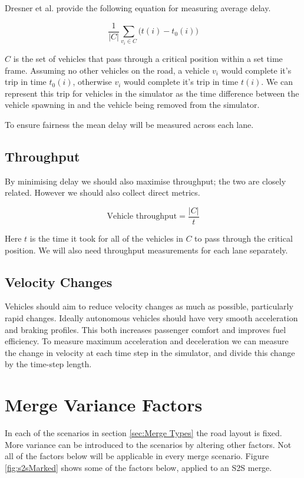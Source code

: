 Dresner et al. provide the following equation for measuring average delay.

\begin{equation}
\frac{1}{|C|}\sum_{v_i\in{C}}\bigl(t(i) - t_0(i)\bigr)
\end{equation}

$C$ is the set of vehicles that pass through a critical position within a set time frame. Assuming no other vehicles on the road, a vehicle $v_i$ would complete it's trip in time $t_0(i)$, otherwise $v_i$ would complete it's trip in time $t(i)$. We can represent this trip for vehicles in the simulator as the time difference between the vehicle spawning in and the vehicle being removed from the simulator.

To ensure fairness the mean delay will be measured across each lane.

\subsection{Throughput}
\label{subsec:Throughput}
By minimising delay we should also maximise throughput; the two are closely related. However we should also collect direct metrics.

\begin{equation}
\text{Vehicle throughput} = \frac{|C|}{t}
\end{equation}

Here $t$ is the time it took for all of the vehicles in $C$ to pass through the critical position. We will also need throughput measurements for each lane separately.

\subsection{Velocity Changes}
\label{subsec:Velocity Changes}
Vehicles should aim to reduce velocity changes as much as possible, particularly rapid changes. Ideally autonomous vehicles should have very smooth acceleration and braking profiles. This both increases passenger comfort and improves fuel efficiency. To measure maximum acceleration and deceleration we can measure the change in velocity at each time step in the simulator, and divide this change by the time-step length.

\section{Merge Variance Factors}
\label{sec:Merge Variance Factors}
In each of the scenarios in section \ref{sec:Merge Types} the road layout is fixed. More variance can be introduced to the scenarios by altering other factors. Not all of the factors below will be applicable in every merge scenario. Figure \ref{fig:s2sMarked} shows some of the factors below, applied to an S2S merge.


